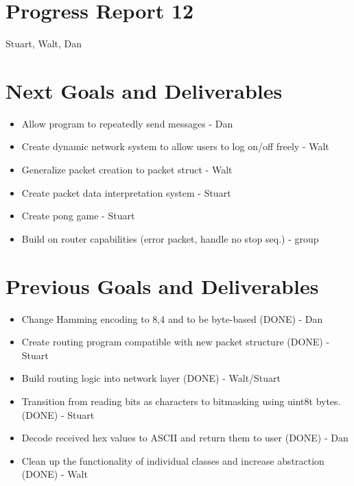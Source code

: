 \documentclass{article}
\begin{document}
\section*{Progress Report 12}
Stuart, Walt, Dan

\section*{Next Goals and Deliverables}
\begin{itemize}
    \item Allow program to repeatedly send messages - Dan
    \item Create dynamic network system to allow users to log on/off freely - Walt
    \item Generalize packet creation to packet struct - Walt
    \item Create packet data interpretation system - Stuart
    \item Create pong game - Stuart
    \item Build on router capabilities (error packet, handle no stop seq.) - group
    
\end{itemize}

\section*{Previous Goals and Deliverables}
\begin{itemize}
    \item Change Hamming encoding to 8,4 and to be byte-based (DONE) - Dan
    \item Create routing program compatible with new packet structure (DONE) - Stuart
    \item Build routing logic into network layer (DONE) - Walt/Stuart
    \item Transition from reading bits as characters to bitmasking using uint8t bytes. (DONE) - Stuart
    \item Decode received hex values to ASCII and return them to user (DONE) - Dan
    \item Clean up the functionality of individual classes and increase abstraction (DONE) - Walt
\end{itemize}
\end{document}

